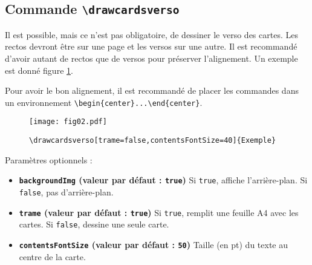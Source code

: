 \documentclass[a4paper, 12pt]{article}
\newcommand{\key}[3]{\textbf{\texttt{#1} (valeur par défaut : \texttt{#2})} #3}
\newcommand{\commande}[1]{\texttt{\textbackslash#1}}
\begin{document}
	\subsection{Commande \commande{drawcardsverso}}
Il est possible, mais ce n'est pas obligatoire, de dessiner le verso des cartes. Les rectos devront être sur une page et les versos sur une autre. Il est recommandé d'avoir autant de rectos que de versos pour préserver l'alignement. Un exemple est donné figure \ref{fig:verso}.

Pour avoir le bon alignement, il est recommandé de placer les commandes dans un environnement \verb!\begin{center}...\end{center}!.
\begin{figure}[h]\begin{center}
	\caption{\commande{drawcardsverso[trame=false,contentsFontSize=40]\{Exemple\}}}
	\texttt{[image: fig02.pdf]}\label{fig:verso}
\end{center}\end{figure}

Paramètres optionnels :
\begin{itemize}
	\item \key{backgroundImg}{true}{Si \texttt{true}, affiche l'arrière-plan. Si \texttt{false}, pas d'arrière-plan.}
	\item \key{trame}{true}{Si \texttt{true}, remplit une feuille A4 avec les cartes. Si \texttt{false}, dessine une seule carte.}
	\item \key{contentsFontSize}{50}{Taille (en pt) du texte au centre de la carte.}
\end{itemize}
\end{document}
